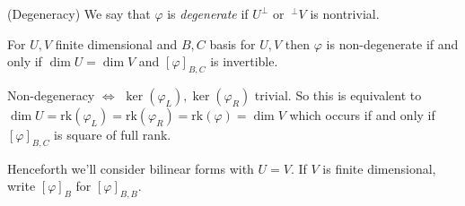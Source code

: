 \documentclass{article}
\newcommand{\rk}{\mathrm{rk}}
\begin{document}
\begin{definition}
	(Degeneracy) We say that $ \varphi $ is \textit{degenerate} if $ U^\perp $ or $ \ ^\perp V $ is nontrivial.
\end{definition}
\begin{proposition}
	For $ U,V $ finite dimensional and $ B,C $ basis for $ U,V $ then $ \varphi $ is non-degenerate if and only if $ \dim U=\dim V $ and $ [\varphi]_{B,C} $ is invertible.
\end{proposition}
\pf Non-degeneracy $ \iff $ $ \ker(\varphi_L),\ker(\varphi_R) $ trivial. So this is equivalent to $ \dim U=\rk(\varphi_L)=\rk(\varphi_R)=\rk(\varphi)=\dim V $ which occurs if and only if $ [\varphi]_{B,C} $ is square of full rank.
\par
Henceforth we'll consider bilinear forms with $ U=V $. If $ V $ is finite dimensional, write $ [\varphi]_B $ for $ [\varphi]_{B,B} $.
\end{document}
